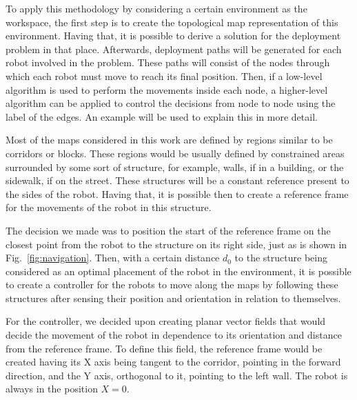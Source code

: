 \documentclass[twocolumn]{svjour3}       %
\begin{document}
To apply this methodology by considering a certain environment as the workspace, the first step is to create the topological map representation of this environment. Having that, it is possible to derive a solution for the deployment problem in that place. Afterwards, deployment paths will be generated for each robot involved in the problem. These paths will consist of the nodes through which each robot must move to reach its final position. Then, if a low-level algorithm is used to perform the movements inside each node, a higher-level algorithm can be applied to control the decisions from node to node using the label of the edges. An example will be used to explain this in more detail.

%


%
Most of the maps considered in this work are defined by regions similar to be corridors or blocks. These regions would be usually defined by constrained areas surrounded by some sort of structure, for example, walls, if in a building, or the sidewalk, if on the street. These structures will be a constant reference present to the sides of the robot. Having that, it is possible then to create a reference frame for the movements of the robot in this structure.

The decision we made was to position the start of the reference frame on the closest point from the robot to the structure on its right side, just as is shown in Fig.~\ref{fig:navigation}. Then, with a certain distance $d_0$ to the structure being considered as an optimal placement of the robot in the environment, it is possible to create a controller for the robots to move along the maps by following these structures after sensing their position and orientation in relation to themselves.

For the controller, we decided upon creating planar vector fields that would decide the movement of the robot in dependence to its orientation and distance from the reference frame. To define this field, the reference frame would be created having its X axis being tangent to the corridor, pointing in the forward direction, and the Y axis, orthogonal to it, pointing to the left wall. The robot is always in the position $X=0$.
\end{document}
